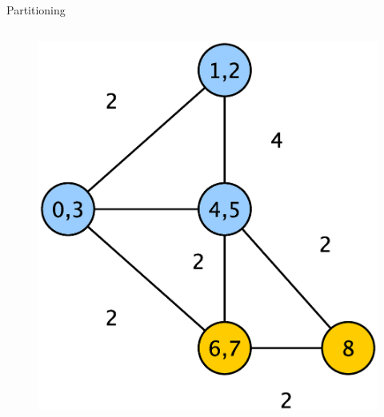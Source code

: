 \documentclass{beamer}
\begin{document}
\begin{frame}{Partitioning}
\begin{columns}[c]
    \begin{center}
      \begin{figure}[htbp]
        \includegraphics[scale=.15]{img/partition.eps}
      \end{figure}
    \end{center}

  \end{columns}
\end{frame}
\end{document}
